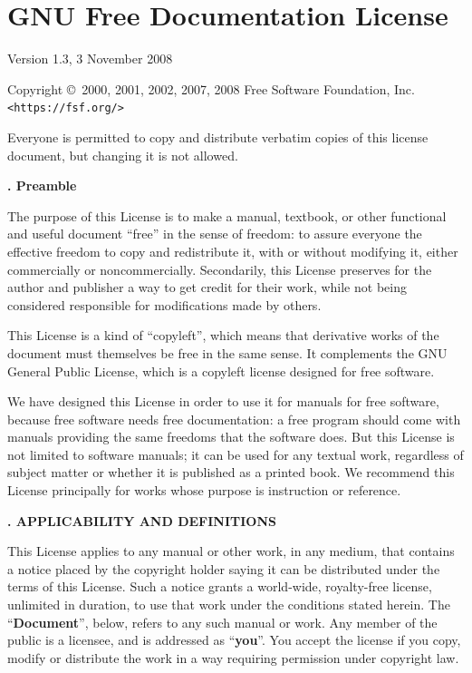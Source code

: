 \chapter{GNU Free Documentation License}

\begingroup \small

\begin{center}
    Version 1.3, 3 November 2008
\end{center}
\bigskip

Copyright \copyright\ 2000, 2001, 2002, 2007, 2008 Free Software Foundation, Inc. \texttt{<https://fsf.org/>}

Everyone is permitted to copy and distribute verbatim copies of this license document, but changing it is not allowed.

\begin{flushleft}
    {\large\bfseries{}. Preamble\par}
\end{flushleft}

The purpose of this License is to make a manual, textbook, or other
functional and useful document ``free'' in the sense of freedom: to
assure everyone the effective freedom to copy and redistribute it,
with or without modifying it, either commercially or noncommercially.
Secondarily, this License preserves for the author and publisher a way
to get credit for their work, while not being considered responsible
for modifications made by others.

This License is a kind of ``copyleft'', which means that derivative
works of the document must themselves be free in the same sense.  It
complements the GNU General Public License, which is a copyleft
license designed for free software.

We have designed this License in order to use it for manuals for free
software, because free software needs free documentation: a free
program should come with manuals providing the same freedoms that the
software does.  But this License is not limited to software manuals;
it can be used for any textual work, regardless of subject matter or
whether it is published as a printed book.  We recommend this License
principally for works whose purpose is instruction or reference.


\begin{flushleft}
    {\large\bfseries{}. APPLICABILITY AND DEFINITIONS\par}
\end{flushleft}

This License applies to any manual or other work, in any medium, that
contains a notice placed by the copyright holder saying it can be
distributed under the terms of this License.  Such a notice grants a
world-wide, royalty-free license, unlimited in duration, to use that
work under the conditions stated herein.  The ``\textbf{Document}'', below,
refers to any such manual or work.  Any member of the public is a
licensee, and is addressed as ``\textbf{you}''.  You accept the license if you
copy, modify or distribute the work in a way requiring permission
under copyright law.


